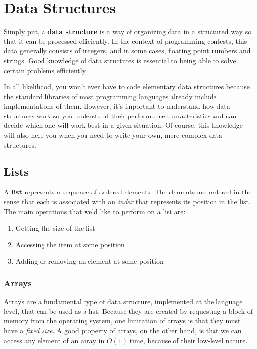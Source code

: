 \chapter{Data Structures}

Simply put, a \textbf{data structure} is a way of organizing data in a structured way so that it can be processed efficiently. In the context of programming contests, this data generally consists of integers, and in some cases, floating point numbers and strings. Good knowledge of data structures is essential to being able to solve certain problems efficiently.

In all likelihood, you won't ever have to code elementary data structures because the standard libraries of most programming languages already include implementations of them. However, it's important to understand how data structures work so you understand their performance characteristics and can decide which one will work best in a given situation. Of course, this knowledge will also help you when you need to write your own, more complex data structures.



\section{Lists}

A \textbf{list} represents a sequence of ordered elements. The elements are ordered in the sense that each is associated with an \textit{index} that represents its position in the list. The main operations that we'd like to perform on a list are:

\begin{enumerate}
    \item Getting the size of the list
    \item Accessing the item at some position
    \item Adding or removing an element at some position
\end{enumerate}


\subsection{Arrays}

Arrays are a fundamental type of data structure, implemented at the language level, that can be used as a list. Because they are created by requesting a block of memory from the operating system, one limitation of arrays is that they must have a \textit{fixed size}. A good property of arrays, on the other hand, is that we can access any element of an array in $O(1)$ time, because of their low-level nature.

